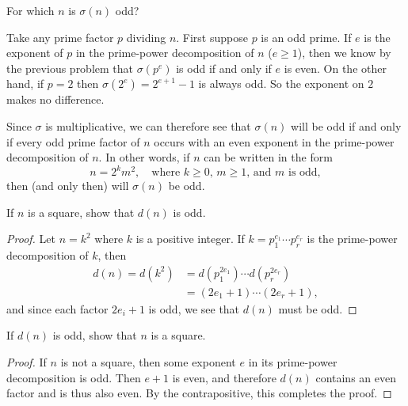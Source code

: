  For which $n$ is $\sigma(n)$ odd?
\begin{solution}
  Take any prime factor $p$ dividing $n$. First suppose $p$ is an odd
  prime. If $e$ is the exponent of $p$ in the prime-power
  decomposition of $n$ ($e\geq1$), then we know by the previous
  problem that $\sigma(p^e)$ is odd if and only if $e$ is even. On the
  other hand, if $p = 2$ then $\sigma(2^e) = 2^{e+1} - 1$ is always
  odd. So the exponent on $2$ makes no difference.

  Since $\sigma$ is multiplicative, we can therefore see that
  $\sigma(n)$ will be odd if and only if every odd prime factor of $n$
  occurs with an even exponent in the prime-power decomposition of
  $n$. In other words, if $n$ can be written in the form
  \begin{equation*}
    n = 2^km^2,
    \quad\text{where $k\geq0$, $m\geq1$, and $m$ is odd},
  \end{equation*}
  then (and only then) will $\sigma(n)$ be odd.
\end{solution}

 If $n$ is a square, show that $d(n)$ is odd.
\begin{proof}
  Let $n = k^2$ where $k$ is a positive integer. If
  $k = p_1^{e_1}\cdots p_r^{e_r}$ is the prime-power decomposition of
  $k$, then
  \begin{align*}
    d(n) = d(k^2) &= d(p_1^{2e_1})\cdots d(p_r^{2e_r}) \\
                  &= (2e_1 + 1)\cdots(2e_r + 1),
  \end{align*}
  and since each factor $2e_i + 1$ is odd, we see that $d(n)$ must be
  odd.
\end{proof}

\label{problem:divisors:d-n-is-odd-implies-n-is-square}
If $d(n)$ is odd, show that $n$ is a square.
\begin{proof}
  If $n$ is not a square, then some exponent $e$ in its prime-power
  decomposition is odd. Then $e + 1$ is even, and therefore $d(n)$
  contains an even factor and is thus also even. By the
  contrapositive, this completes the proof.
\end{proof}

